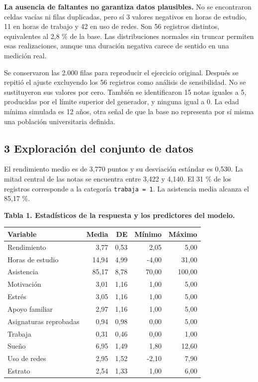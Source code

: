 \documentclass[
  11pt,
  letterpaper,
]{article}
\begin{document}
\textbf{La ausencia de faltantes no garantiza datos plausibles.} No se
encontraron celdas vacías ni filas duplicadas, pero sí 3 valores
negativos en horas de estudio, 11 en horas de trabajo y 42 en uso de
redes. Son 56 registros distintos, equivalentes al 2,8 \% de la base.
Las distribuciones normales sin truncar permiten esas realizaciones,
aunque una duración negativa carece de sentido en una medición real.

Se conservaron las 2.000 filas para reproducir el ejercicio original.
Después se repitió el ajuste excluyendo los 56 registros como análisis
de sensibilidad. No se sustituyeron sus valores por cero. También se
identificaron 15 notas iguales a 5, producidas por el límite superior
del generador, y ninguna igual a 0. La edad mínima simulada es 12 años,
otra señal de que la base no representa por sí misma una población
universitaria definida.

\newpage

\hypertarget{exploraciuxf3n-del-conjunto-de-datos}{%
\subsection{3 Exploración del conjunto de
datos}\label{exploraciuxf3n-del-conjunto-de-datos}}

El rendimiento medio es de 3,770 puntos y su desviación estándar es
0,530. La mitad central de las notas se encuentra entre 3,422 y 4,140.
El 31 \% de los registros corresponde a la categoría
\texttt{trabaja\ =\ 1}. La asistencia media alcanza el 85,17 \%.

\textbf{Tabla 1. Estadísticos de la respuesta y los predictores del
modelo.}

\begin{longtable}[]{@{}lrrrr@{}}
\toprule\noalign{}
Variable & Media & DE & Mínimo & Máximo \\
\midrule\noalign{}
\endhead
\bottomrule\noalign{}
\endlastfoot
Rendimiento & 3,77 & 0,53 & 2,05 & 5,00 \\
Horas de estudio & 14,94 & 4,99 & -4,00 & 31,00 \\
Asistencia & 85,17 & 8,78 & 70,00 & 100,00 \\
Motivación & 3,01 & 1,16 & 1,00 & 5,00 \\
Estrés & 3,05 & 1,16 & 1,00 & 5,00 \\
Apoyo familiar & 2,97 & 1,16 & 1,00 & 5,00 \\
Asignaturas reprobadas & 0,94 & 0,98 & 0,00 & 5,00 \\
Trabaja & 0,31 & 0,46 & 0,00 & 1,00 \\
Sueño & 6,95 & 1,49 & 1,80 & 12,60 \\
Uso de redes & 2,95 & 1,52 & -2,10 & 7,90 \\
Estrato & 2,54 & 1,33 & 1,00 & 6,00 \\
\end{longtable}
\end{document}
